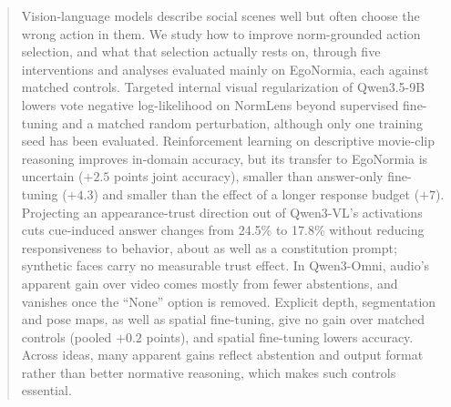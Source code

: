 \begin{abstract}
Vision-language models describe social scenes well but often choose the wrong action in them. We study how to improve norm-grounded action selection, and what that selection actually rests on, through five interventions and analyses evaluated mainly on EgoNormia, each against matched controls. Targeted internal visual regularization of Qwen3.5-9B lowers vote negative log-likelihood on NormLens beyond supervised fine-tuning and a matched random perturbation, although only one training seed has been evaluated. Reinforcement learning on descriptive movie-clip reasoning improves in-domain accuracy, but its transfer to EgoNormia is uncertain ($+2.5$ points joint accuracy), smaller than answer-only fine-tuning ($+4.3$) and smaller than the effect of a longer response budget ($+7$). Projecting an appearance-trust direction out of Qwen3-VL's activations cuts cue-induced answer changes from 24.5\% to 17.8\% without reducing responsiveness to behavior, about as well as a constitution prompt; synthetic faces carry no measurable trust effect. In Qwen3-Omni, audio's apparent gain over video comes mostly from fewer abstentions, and vanishes once the ``None'' option is removed. Explicit depth, segmentation and pose maps, as well as spatial fine-tuning, give no gain over matched controls (pooled $+0.2$ points), and spatial fine-tuning lowers accuracy. Across ideas, many apparent gains reflect abstention and output format rather than better normative reasoning, which makes such controls essential.
\end{abstract}
